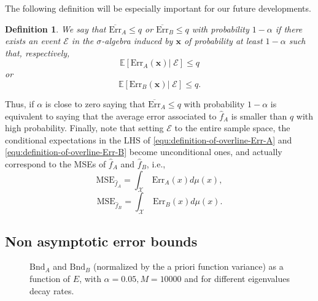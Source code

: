 \documentclass[10pt,twocolumn,twoside]{IEEEtran}					%
\newcounter{generalCounter}
\theoremstyle	{plain}
\newtheorem		{definition}	[generalCounter]	{Definition}
\newcommand{\Expectation}					[0]	{\mathbb{E}}
\newcommand{\ExpectationOf}					[1]	{\Expectation \left[ #1 \right]}
\begin{document}
The following definition will be especially important for our future developments.

\begin{definition}
	\label{def:BarE}
	We say that $\overline{\mathrm{Err}}_{A} \leq q$ or $\overline{\mathrm{Err}}_{B} \leq q$ with probability $1 - \alpha$ if there exists an event $\mathcal{E}$ in the $\sigma$-algebra induced by $\bm{x}$ of probability at least $1-\alpha$ such that, respectively,
	\begin{equation}
		\ExpectationOf{ \mathrm{Err}_{A}(\bm{x}) \left| \; \mathcal{E} \right. } \leq q
		\label{equ:definition-of-overline-Err-A}
	\end{equation}
	or 
	\begin{equation}
		\ExpectationOf{ \mathrm{Err}_{B}(\bm{x}) \left| \; \mathcal{E} \right. } \leq q.
		\label{equ:definition-of-overline-Err-B}
	\end{equation}
\end{definition}

Thus, if $\alpha$ is close to zero saying that $\overline{\mathrm{Err}}_{A} \leq q$ with probability $1-\alpha$ is equivalent to saying that the average error associated to $\widehat{f}_{A}$ is smaller than $q$ with high probability. Finally, note that setting $\mathcal{E}$ to the entire sample space, the conditional expectations in the \ac{LHS} of \eqref{equ:definition-of-overline-Err-A} and \eqref{equ:definition-of-overline-Err-B} become unconditional ones, and actually correspond to the \acp{MSE} of $\widehat{f}_{A}$ and $\widehat{f}_{B}$, i.e.,
%
\begin{equation} \label{MSEA}
\text{MSE}_{\widehat{f}_{A}} = \int_{\mathcal{X}} \ \mathrm{Err}_{A}(x) d\mu(x), 
\end{equation}
%
\begin{equation} \label{MSEB}
\text{MSE}_{\widehat{f}_{B}} = \int_{\mathcal{X}} \ \mathrm{Err}_{B}(x) d\mu(x).
\end{equation}

\subsection{Non asymptotic error bounds}

\begin{figure*}
	\centering
	
	\caption{$\mathrm{Bnd}_{A}$ and $\mathrm{Bnd}_{B}$ (normalized by the a priori function variance) as a function of $E$, with $\alpha = 0.05,M=10000$ and for different eigenvalues decay rates.}
\label{fig:bounds}
\end{figure*}
\end{document}
